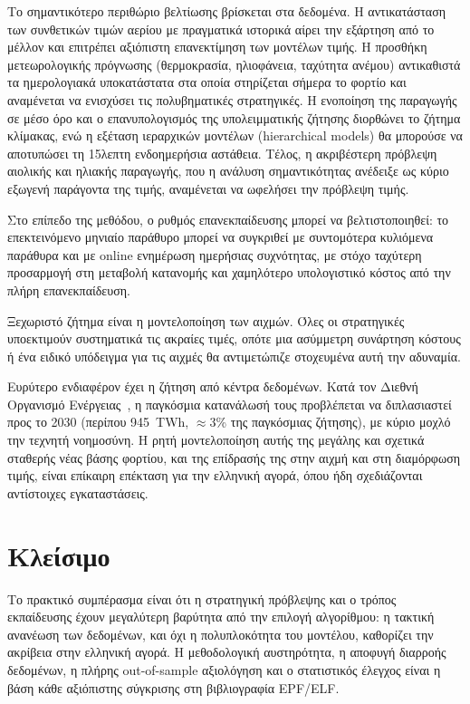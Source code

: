 Το σημαντικότερο περιθώριο βελτίωσης βρίσκεται στα δεδομένα. Η αντικατάσταση των συνθετικών
τιμών αερίου με πραγματικά ιστορικά αίρει την εξάρτηση από το μέλλον και επιτρέπει αξιόπιστη
επανεκτίμηση των μοντέλων τιμής. Η προσθήκη μετεωρολογικής πρόγνωσης (θερμοκρασία,
ηλιοφάνεια, ταχύτητα ανέμου) αντικαθιστά τα ημερολογιακά υποκατάστατα στα οποία στηρίζεται
σήμερα το φορτίο και αναμένεται να ενισχύσει τις πολυβηματικές στρατηγικές. Η ενοποίηση της παραγωγής σε μέσο όρο και ο επανυπολογισμός της υπολειμματικής ζήτησης
διορθώνει το ζήτημα κλίμακας, ενώ η εξέταση ιεραρχικών μοντέλων (hierarchical models) θα μπορούσε να αποτυπώσει τη 15λεπτη ενδοημερήσια αστάθεια.
Τέλος, η ακριβέστερη πρόβλεψη αιολικής και ηλιακής παραγωγής,
που η ανάλυση σημαντικότητας ανέδειξε ως κύριο εξωγενή παράγοντα της τιμής, αναμένεται να
ωφελήσει την πρόβλεψη τιμής.


Στο επίπεδο της μεθόδου, ο ρυθμός επανεκπαίδευσης μπορεί να βελτιστοποιηθεί: το επεκτεινόμενο
μηνιαίο παράθυρο μπορεί να συγκριθεί με συντομότερα κυλιόμενα παράθυρα και με online
ενημέρωση ημερήσιας συχνότητας, με στόχο ταχύτερη προσαρμογή στη μεταβολή κατανομής και
χαμηλότερο υπολογιστικό κόστος από την πλήρη επανεκπαίδευση.

Ξεχωριστό ζήτημα είναι η μοντελοποίηση των αιχμών. Όλες οι στρατηγικές υποεκτιμούν
συστηματικά τις ακραίες τιμές, οπότε μια ασύμμετρη συνάρτηση κόστους ή ένα ειδικό υπόδειγμα
για τις αιχμές θα αντιμετώπιζε στοχευμένα αυτή την αδυναμία.

Ευρύτερο ενδιαφέρον έχει η ζήτηση από κέντρα δεδομένων. Κατά τον Διεθνή Οργανισμό
Ενέργειας~\cite{iea2024_electricity}, η παγκόσμια κατανάλωσή τους προβλέπεται να
διπλασιαστεί προς το 2030 (περίπου 945~TWh, $\approx$3\% της παγκόσμιας ζήτησης),
με κύριο μοχλό την τεχνητή νοημοσύνη. Η
ρητή μοντελοποίηση αυτής της μεγάλης και σχετικά σταθερής νέας βάσης φορτίου, και της
επίδρασής της στην αιχμή και στη διαμόρφωση τιμής, είναι επίκαιρη επέκταση για την ελληνική
αγορά, όπου ήδη σχεδιάζονται αντίστοιχες εγκαταστάσεις.

\section{Κλείσιμο}
\label{sec:conc_closing}

Το πρακτικό συμπέρασμα είναι ότι η στρατηγική πρόβλεψης και ο τρόπος εκπαίδευσης έχουν
μεγαλύτερη βαρύτητα από την επιλογή αλγορίθμου: η τακτική ανανέωση των δεδομένων, και όχι
η πολυπλοκότητα του μοντέλου, καθορίζει την ακρίβεια στην ελληνική αγορά. Η μεθοδολογική
αυστηρότητα, η αποφυγή διαρροής δεδομένων, η πλήρης out-of-sample αξιολόγηση και ο
στατιστικός έλεγχος είναι η βάση κάθε αξιόπιστης σύγκρισης στη βιβλιογραφία EPF/ELF.

